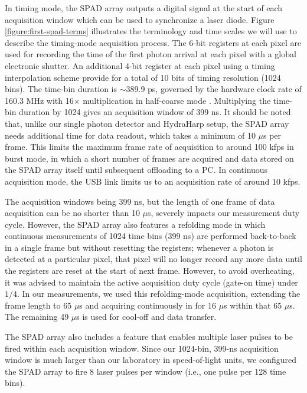 In timing mode, the SPAD array outputs a digital signal at the start of each acquisition window which can be used to synchronize a laser diode. Figure \ref{figure:first-spad-terms} illustrates the terminology and time scales we will use to describe the timing-mode acquisition process. The 6-bit registers at each pixel are used for recording the time of the first photon arrival at each pixel with a global electronic shutter. An additional 4-bit register at each pixel using a timing interpolation scheme \cite{villa-thesis} provide for a total of 10 bits of timing resolution (1024 bins). The time-bin duration is $\sim$389.9 ps, governed by the hardware clock rate of 160.3 MHz with 16$\times$ multiplication in half-coarse mode \cite{villa-thesis}. Multiplying the time-bin duration by 1024 gives an acquisition window of 399 ns. It should be noted that, unlike our single photon detector and HydraHarp setup, the SPAD array needs additional time for data readout, which takes a minimum of 10 $\mu$s per frame. This limits the maximum frame rate of acquisition to around 100 kfps in burst mode, in which a short number of frames are acquired and data stored on the SPAD array itself until subsequent offloading to a PC. In continuous acquisition mode, the USB link limits us to an acquisition rate of around 10 kfps.

The acquisition windows being 399 ns, but the length of one frame of data acquisition can be no shorter than 10 $\mu$s, severely impacts our measurement duty cycle. However, the SPAD array also features a refolding mode in which continuous measurements of 1024 time bins (399 ns) are performed back-to-back in a single frame but without resetting the registers; whenever a photon is detected at a particular pixel, that pixel will no longer record any more data until the registers are reset at the start of next frame. However, to avoid overheating, it was advised to maintain the active acquisition duty cycle (gate-on time) under $1/4$. In our measurements, we used this refolding-mode acquisition, extending the frame length to 65 $\mu$s and acquiring continuously in for 16 $\mu$s within that 65 $\mu$s. The remaining 49 $\mu$s is used for cool-off and data transfer.

The SPAD array also includes a feature that enables multiple laser pulses to be fired within each acquisition window. Since our 1024-bin, 399-ns acquisition window is much larger than our laboratory in speed-of-light units, we configured the SPAD array to fire 8 laser pulses per window (i.e., one pulse per 128 time bins).

